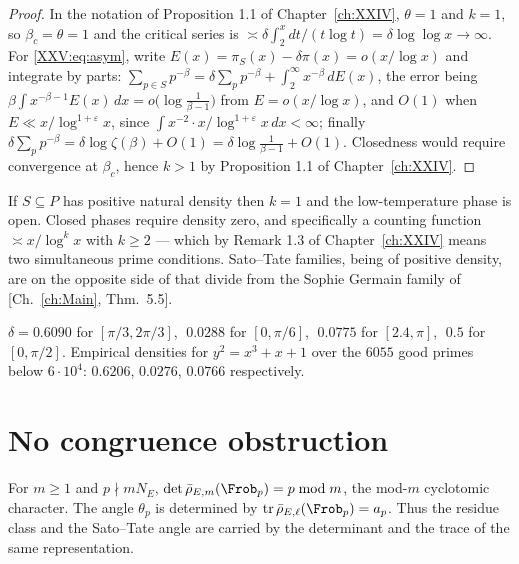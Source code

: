 \begin{proof}
In the notation of Proposition 1.1 of Chapter~\ref{ch:XXIV}, $\theta=1$ and $k=1$, so $\beta_c=\theta=1$
and the critical series is $\asymp\delta\int_2^xdt/(t\log t)=\delta\log\log x\to\infty$. For
\eqref{XXV:eq:asym}, write $E(x)=\pi_S(x)-\delta\pi(x)=o(x/\log x)$ and integrate by parts:
$\sum_{p\in S}p^{-\beta}=\delta\sum_pp^{-\beta}+\int_2^\infty x^{-\beta}\,dE(x)$, the
error being $\beta\int x^{-\beta-1}E(x)\,dx=o\bigl(\log\frac1{\beta-1}\bigr)$ from
$E=o(x/\log x)$, and $O(1)$ when $E\ll x/\log^{1+\varepsilon}x$, since
$\int x^{-2}\cdot x/\log^{1+\varepsilon}x\,dx<\infty$; finally
$\delta\sum_pp^{-\beta}=\delta\log\zeta(\beta)+O(1)=\delta\log\frac{1}{\beta-1}+O(1)$. Closedness would require
convergence at $\beta_c$, hence $k>1$ by Proposition 1.1 of Chapter~\ref{ch:XXIV}.
\end{proof}

\begin{corollary}\label{XXV:cor:noclosed}
If $S\subseteq P$ has positive natural density then $k=1$ and the low-temperature phase is
open. Closed phases require density zero, and specifically a counting function
$\asymp x/\log^kx$ with $k\ge2$ --- which by Remark 1.3 of Chapter~\ref{ch:XXIV} means two
simultaneous prime conditions. Sato--Tate families, being of positive density, are on the
opposite side of that divide from the Sophie Germain family of [Ch.~\ref{ch:Main}, Thm.~5.5].
\end{corollary}

\begin{example}\label{XXV:ex:densities}
$\delta=0.6090$ for $[\pi/3,2\pi/3]$, $\;0.0288$ for $[0,\pi/6]$, $\;0.0775$ for
$[2.4,\pi]$, $\;0.5$ for $[0,\pi/2]$. Empirical densities for $y^2=x^3+x+1$ over the
$6055$ good primes below $6\cdot10^4$: $0.6206$, $0.0276$, $0.0766$ respectively.
\end{example}

\section{No congruence obstruction}

\begin{lemma}\label{XXV:lem:det}
For $m\ge1$ and $p\nmid m N_E$, $\det\bar\rho_{E,m}(\Frob_p)=p\bmod m$, the mod-$m$
cyclotomic character. The angle $\theta_p$ is determined by
$\Tr\bar\rho_{E,\ell}(\Frob_p)=a_p$. Thus the residue class and the Sato--Tate angle are
carried by the determinant and the trace of the same representation.
\end{lemma}

